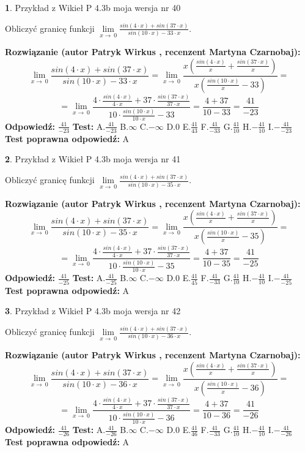 \documentclass[12pt, a4paper]{article}
\theoremstyle{definition} %
\newtheorem{zad}{}
\newcommand{\zadStart}[1]{\begin{zad}#1\newline}
\newcommand{\zadStop}{\end{zad}}
\newcommand{\rozwStart}[2]{\noindent \textbf{Rozwiązanie (autor #1 , recenzent #2): }\newline}
\newcommand{\rozwStop}{\newline}
\newcommand{\odpStart}{\noindent \textbf{Odpowiedź:}\newline}
\newcommand{\odpStop}{\newline}
\newcommand{\testStart}{\noindent \textbf{Test:}\newline}
\newcommand{\testStop}{\newline}
\newcommand{\kluczStart}{\noindent \textbf{Test poprawna odpowiedź:}\newline}
\newcommand{\kluczStop}{\newline}
\begin{document}
\zadStart{Przykład z Wikieł P 4.3b moja wersja nr 40}


Obliczyć granicę funkcji $\lim\limits_{x\to\ 0}\frac{sin(4 \cdot x)+sin(37 \cdot x)}{sin(10 \cdot x)-33 \cdot x}$.
\zadStop
\rozwStart{Patryk Wirkus}{Martyna Czarnobaj}
$$\lim\limits_{x\to\ 0}\frac{sin(4 \cdot x)+sin(37 \cdot x)}{sin(10 \cdot x)-33 \cdot x}=\lim\limits_{x\to\ 0}\frac{x(\frac{sin(4 \cdot x)}{x}+\frac{sin(37 \cdot x)}{x})}{x(\frac{sin(10 \cdot x)}{x}-33)}=$$
$$=\lim\limits_{x\to\ 0}\frac{4 \cdot \frac{sin(4 \cdot x)}{4 \cdot x}+37 \cdot \frac{sin(37 \cdot x)}{37 \cdot x}}{10 \cdot \frac{sin(10 \cdot x)}{10 \cdot x}-33}=\frac{4+37}{10-33} = \frac{41}{-23}$$
\rozwStop
\odpStart
$\frac{41}{-23}$
\odpStop
\testStart
A.$\frac{41}{-23}$
B.$\infty$
C.$-\infty$
D.$0$
E.$\frac{41}{43}$
F.$\frac{41}{-33}$
G.$\frac{41}{10}$
H.$-\frac{41}{10}$
I.$-\frac{41}{-23}$
\testStop
\kluczStart
A
\kluczStop



\zadStart{Przykład z Wikieł P 4.3b moja wersja nr 41}


Obliczyć granicę funkcji $\lim\limits_{x\to\ 0}\frac{sin(4 \cdot x)+sin(37 \cdot x)}{sin(10 \cdot x)-35 \cdot x}$.
\zadStop
\rozwStart{Patryk Wirkus}{Martyna Czarnobaj}
$$\lim\limits_{x\to\ 0}\frac{sin(4 \cdot x)+sin(37 \cdot x)}{sin(10 \cdot x)-35 \cdot x}=\lim\limits_{x\to\ 0}\frac{x(\frac{sin(4 \cdot x)}{x}+\frac{sin(37 \cdot x)}{x})}{x(\frac{sin(10 \cdot x)}{x}-35)}=$$
$$=\lim\limits_{x\to\ 0}\frac{4 \cdot \frac{sin(4 \cdot x)}{4 \cdot x}+37 \cdot \frac{sin(37 \cdot x)}{37 \cdot x}}{10 \cdot \frac{sin(10 \cdot x)}{10 \cdot x}-35}=\frac{4+37}{10-35} = \frac{41}{-25}$$
\rozwStop
\odpStart
$\frac{41}{-25}$
\odpStop
\testStart
A.$\frac{41}{-25}$
B.$\infty$
C.$-\infty$
D.$0$
E.$\frac{41}{45}$
F.$\frac{41}{-33}$
G.$\frac{41}{10}$
H.$-\frac{41}{10}$
I.$-\frac{41}{-25}$
\testStop
\kluczStart
A
\kluczStop



\zadStart{Przykład z Wikieł P 4.3b moja wersja nr 42}


Obliczyć granicę funkcji $\lim\limits_{x\to\ 0}\frac{sin(4 \cdot x)+sin(37 \cdot x)}{sin(10 \cdot x)-36 \cdot x}$.
\zadStop
\rozwStart{Patryk Wirkus}{Martyna Czarnobaj}
$$\lim\limits_{x\to\ 0}\frac{sin(4 \cdot x)+sin(37 \cdot x)}{sin(10 \cdot x)-36 \cdot x}=\lim\limits_{x\to\ 0}\frac{x(\frac{sin(4 \cdot x)}{x}+\frac{sin(37 \cdot x)}{x})}{x(\frac{sin(10 \cdot x)}{x}-36)}=$$
$$=\lim\limits_{x\to\ 0}\frac{4 \cdot \frac{sin(4 \cdot x)}{4 \cdot x}+37 \cdot \frac{sin(37 \cdot x)}{37 \cdot x}}{10 \cdot \frac{sin(10 \cdot x)}{10 \cdot x}-36}=\frac{4+37}{10-36} = \frac{41}{-26}$$
\rozwStop
\odpStart
$\frac{41}{-26}$
\odpStop
\testStart
A.$\frac{41}{-26}$
B.$\infty$
C.$-\infty$
D.$0$
E.$\frac{41}{46}$
F.$\frac{41}{-33}$
G.$\frac{41}{10}$
H.$-\frac{41}{10}$
I.$-\frac{41}{-26}$
\testStop
\kluczStart
A
\kluczStop
\end{document}
